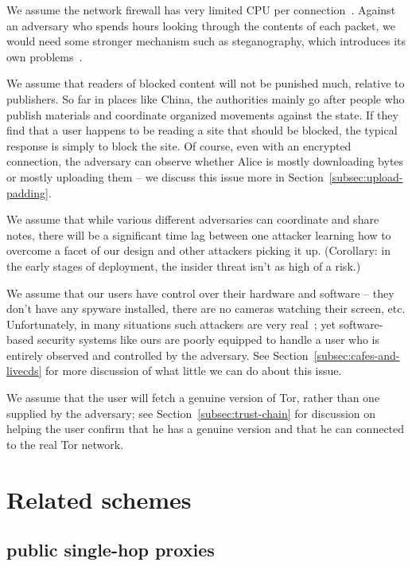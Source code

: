 \documentclass{llncs}
\begin{document}
We assume the network firewall has very limited CPU per
connection~\cite{clayton:pet2006}. Against an adversary who spends
hours looking through the contents of each packet, we would need
some stronger mechanism such as steganography, which introduces its
own problems~\cite{active-wardens,foo,bar}.

We assume that readers of blocked content will not be punished much,
relative to publishers. So far in places like China, the authorities
mainly go after people who publish materials and coordinate organized
movements against the state. If they find that a user happens to be
reading a site that should be blocked, the typical response is simply
to block the site. Of course, even with an encrypted connection,
the adversary can observe whether Alice is mostly downloading
bytes or mostly uploading them -- we discuss this issue more in
Section~\ref{subsec:upload-padding}.

We assume that while various different adversaries can coordinate and share
notes, there will be a significant time lag between one attacker learning
how to overcome a facet of our design and other attackers picking it up.
(Corollary: in the early stages of deployment, the insider threat isn't
as high of a risk.)

We assume that our users have control over their hardware and
software -- they don't have any spyware installed, there are no
cameras watching their screen, etc. Unfortunately, in many situations
such attackers are very real~\cite{zuckerman-threatmodels}; yet
software-based security systems like ours are poorly equipped to handle
a user who is entirely observed and controlled by the adversary. See
Section~\ref{subsec:cafes-and-livecds} for more discussion of what little
we can do about this issue.

We assume that the user will fetch a genuine version of Tor, rather than
one supplied by the adversary; see Section~\ref{subsec:trust-chain}
for discussion on helping the user confirm that he has a genuine version
and that he can connected to the real Tor network.

\section{Related schemes}

\subsection{public single-hop proxies}
\end{document}
